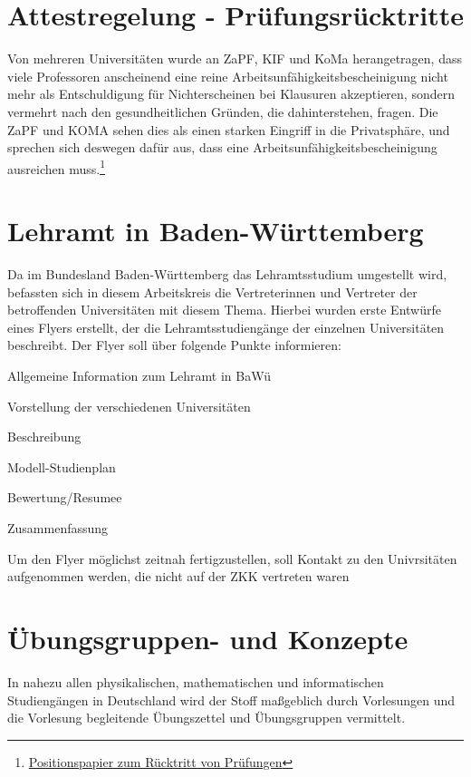 \documentclass{scrartcl}
\begin{document}
\section*{Attestregelung - Prüfungsrücktritte}

Von mehreren Universitäten wurde an ZaPF, KIF und KoMa herangetragen, dass
viele Professoren anscheinend eine reine Arbeitsunfähigkeitsbescheinigung nicht mehr als
Entschuldigung für Nichterscheinen bei Klausuren akzeptieren,
sondern vermehrt nach den gesundheitlichen Gründen, die dahinterstehen, fragen.
Die ZaPF und KOMA sehen dies als einen starken Eingriff in die Privatsphäre, und
sprechen sich deswegen dafür aus, dass eine Arbeitsunfähigkeitsbescheinigung
ausreichen muss.\footnote{\href{http://www.zapfev.de/resolutionen/sose15/Positionspapier\_Ruecktritt\_von\_Pruefungen/Positionspapier\_SoSe15\_Ruecktritt\_von\_Pruefungen.pdf}{Positionspapier zum Rücktritt von Prüfungen}}

\section*{Lehramt in Baden-Württemberg}

Da im Bundesland Baden-Württemberg das Lehramtsstudium umgestellt wird,
befassten sich in diesem Arbeitskreis die Vertreterinnen und Vertreter der
betroffenden Universitäten mit diesem Thema. Hierbei wurden erste Entwürfe
eines Flyers erstellt, der die Lehramtsstudiengänge der einzelnen Universitäten
beschreibt. Der Flyer soll über folgende Punkte informieren:

\begin{compactenum}
    \item Allgemeine Information zum Lehramt in BaWü
    \item Vorstellung der verschiedenen Universitäten
        \begin{compactenum}
        \item Beschreibung
        \item Modell-Studienplan
        \item Bewertung/Resumee
        \end{compactenum}
    \item Zusammenfassung
\end{compactenum}

Um den Flyer möglichst zeitnah fertigzustellen, soll Kontakt zu den Univrsitäten aufgenommen werden, die nicht auf der ZKK vertreten waren

\newpage
\section*{Übungsgruppen- und Konzepte}
In nahezu allen physikalischen, mathematischen und informatischen Studiengängen
in Deutschland wird der Stoff maßgeblich durch Vorlesungen und die Vorlesung
begleitende Übungszettel und Übungsgruppen vermittelt.
\end{document}
